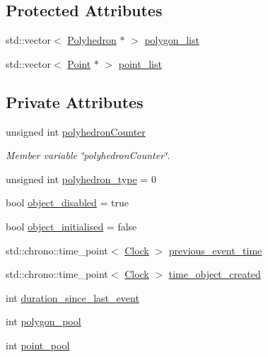 \subsection*{Protected Attributes}
\begin{DoxyCompactItemize}
\item 
std\+::vector$<$ \mbox{\hyperlink{classPolyhedron}{Polyhedron}} $\ast$ $>$ \mbox{\hyperlink{classPolyhedron_afd0cf6dddfbdc36266a73edca0c2c219}{polygon\+\_\+list}}
\item 
std\+::vector$<$ \mbox{\hyperlink{classPoint}{Point}} $\ast$ $>$ \mbox{\hyperlink{classPolyhedron_a4a39c8beb34831634b871dbc301502a6}{point\+\_\+list}}
\end{DoxyCompactItemize}
\subsection*{Private Attributes}
\begin{DoxyCompactItemize}
\item 
unsigned int \mbox{\hyperlink{classPolyhedron_a430c837e8a5a9dafc3ee32e7be24bd66}{polyhedron\+Counter}}
\begin{DoxyCompactList}\small\item\em Member variable \char`\"{}polyhedron\+Counter\char`\"{}. \end{DoxyCompactList}\item 
unsigned int \mbox{\hyperlink{classPolyhedron_aadbb8594382e92c3a9cb4e4592d8bdf5}{polyhedron\+\_\+type}} = 0
\item 
bool \mbox{\hyperlink{classPolyhedron_a7cafd82a09de260c4a5c57a264e4b7db}{object\+\_\+disabled}} = true
\item 
bool \mbox{\hyperlink{classPolyhedron_a33323db978a74f2ceaf15d950b5f18c1}{object\+\_\+initialised}} = false
\item 
std\+::chrono\+::time\+\_\+point$<$ \mbox{\hyperlink{universe_8h_a0ef8d951d1ca5ab3cfaf7ab4c7a6fd80}{Clock}} $>$ \mbox{\hyperlink{classPolyhedron_ae9d82476019a02008de7b1cb2e0e179f}{previous\+\_\+event\+\_\+time}}
\item 
std\+::chrono\+::time\+\_\+point$<$ \mbox{\hyperlink{universe_8h_a0ef8d951d1ca5ab3cfaf7ab4c7a6fd80}{Clock}} $>$ \mbox{\hyperlink{classPolyhedron_a59ae1bf10fa368663a38f3fab34534ca}{time\+\_\+object\+\_\+created}}
\item 
int \mbox{\hyperlink{classPolyhedron_a6ac1eea3357b7c5f70cd508117bba9f9}{duration\+\_\+since\+\_\+last\+\_\+event}}
\item 
int \mbox{\hyperlink{classPolyhedron_a33a190e2cf355ba85a9850a7f083c1c1}{polygon\+\_\+pool}}
\item 
int \mbox{\hyperlink{classPolyhedron_a22f74624a32515bbcf8de8a1818f1ee8}{point\+\_\+pool}}
\end{DoxyCompactItemize}
